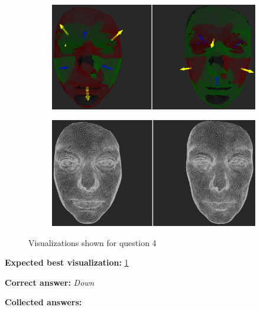 \begin{figure}[h]
\begin{subfigure}{0.49\textwidth}
\includegraphics[width=\textwidth]{./screenshots/pair9.PNG}
\caption{}
\label{fig:study-3-9}
\end{subfigure}
\begin{subfigure}{0.49\textwidth}
\includegraphics[width=\textwidth]{./screenshots/pair6.PNG}
\caption{}
\label{fig:study-3-6}
\end{subfigure}
\caption{Visualizations shown for question 4}
\end{figure}
\medskip

{\bf Expected best visualization:} \ref{fig:study-3-9}
\medskip

{\bf Correct answer:} {\it Down}
\medskip

{\bf Collected answers:}

